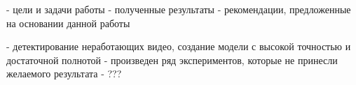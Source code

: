 - цели и задачи работы
- полученные результаты
- рекомендации, предложенные на основании данной работы

- детектирование неработающих видео, создание модели с высокой точностью и достаточной полнотой
- произведен ряд экспериментов, которые не принесли желаемого результата
- ???

